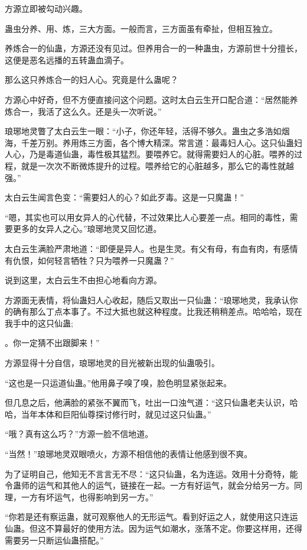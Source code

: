 \begin{this_body}
方源立即被勾动兴趣。

蛊虫分养、用、炼，三大方面。一般而言，三方面虽有牵扯，但相互独立。

养炼合一的仙蛊，方源还没有见过。但养用合一的一种蛊虫，方源前世十分擅长，这便是恶名远播的五转蛊血滴子。

那么这只养炼合一的妇人心。究竟是什么蛊呢？

方源心中好奇，但不方便直接问这个问题。这时太白云生开口配合道：“居然能养炼合一，我活了这么久。还是头一次听说。”

琅琊地灵瞥了太白云生一眼：“小子，你还年轻，活得不够久。蛊虫之多浩如烟海，千差万别。养用炼三方面，各个博大精深。常言道：最毒妇人心。这只仙蛊妇人心，乃是毒道仙蛊，毒性极其猛烈。要喂养它。就得需要妇人的心脏。喂养的过程，就是一次次不断微炼提升的过程。喂养给它的心脏越多，那么它的毒性就越强。”

太白云生闻言色变：“需要妇人的心？如此歹毒。这是一只魔蛊！”

“嗯，其实也可以用女异人的心代替，不过效果比人心要差一点。相同的毒性，需要更多的女异人之心。”琅琊地灵又回忆道。

太白云生满脸严肃地道：“即便是异人。也是生灵。有父有母，有血有肉，有感情有仇恨，如何轻言牺牲？只为喂养一只魔蛊？”

说到这里，太白云生不由担心地看向方源。

方源面无表情，将仙蛊妇人心收起，随后又取出一只仙蛊：“琅琊地灵，我承认你的确有那么丁点本事了。不过大抵也就这种程度。比我还稍稍差点。哈哈哈，现在我手中的这只仙蛊;

。你一定猜不出跟脚来！”

方源显得十分自信，琅琊地灵的目光被新出现的仙蛊吸引。

“这也是一只运道仙蛊。”他用鼻子嗅了嗅，脸色明显紧张起来。

但几息之后，他满脸的紧张不翼而飞，吐出一口浊气道：“这只仙蛊老夫认识，哈哈，当年本体和巨阳仙尊探讨修行时，就见过这只仙蛊。”

“哦？真有这么巧？”方源一脸不信地道。

“当然！”琅琊地灵双眼喷火，方源不相信他的表情让他感到很不爽。

为了证明自己，他知无不言言无不尽：“这只仙蛊，名为连运。效用十分奇特，能令蛊师的运气和其他人的运气，链接在一起。一方有好运气，就会分给另一方。同理，一方有坏运气，也得影响到另一方。”

“你若是还有察运蛊，就可观察他人的无形运气。看到好运之人，就使用这只连运仙蛊。但这不算最好的使用方法。因为运气如潮水，涨落不定。你要这样用，还得需要另一只断运仙蛊搭配。”


\end{this_body}
